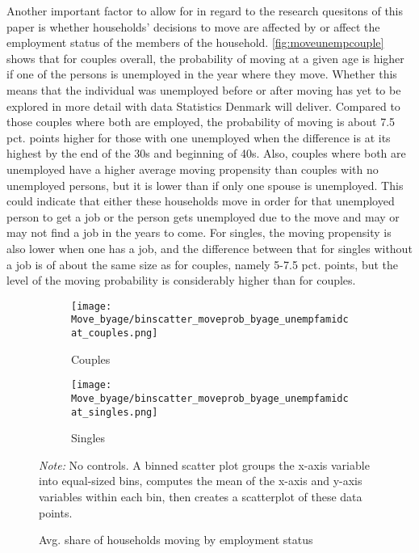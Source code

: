 Another important factor to allow for in regard to the research quesitons of this paper is whether households' decisions to move are affected by or affect the employment status of the members of the household. \autoref{fig:moveunempcouple} shows that for couples overall, the probability of moving at a given age is higher if one of the persons is unemployed in the year where they move. Whether this means that the individual was unemployed before or after moving has yet to be explored in more detail with data Statistics Denmark will deliver. Compared to those couples where both are employed, the probability of moving is about 7.5 pct. points higher for those with one unemployed when the difference is at its highest by the end of the 30s and beginning of 40s. Also, couples where both are unemployed have a higher average moving propensity than couples with no unemployed persons, but it is lower than if only one spouse is unemployed. This could indicate that either these households move in order for that unemployed person to get a job or the person gets unemployed due to the move and may or may not find a job in the years to come. For singles, the moving propensity is also lower when one has a job, and the difference between that for singles without a job is of about the same size as for couples, namely 5-7.5 pct. points, but the level of the moving probability is considerably higher than for couples.
\begin{figure}
\centering
\begin{minipage}{\textwidth}
\begin{subfigure}{.50\textwidth}
  \centering
  \texttt{[image: Move\_byage/binscatter\_moveprob\_byage\_unempfamidcat\_couples.png]}
  \caption{\footnotesize{Couples}}
  \label{fig:moveunempcouple}
\end{subfigure}
\begin{subfigure}{.50\textwidth}
  \centering
  \texttt{[image: Move\_byage/binscatter\_moveprob\_byage\_unempfamidcat\_singles.png]}
  \caption{\footnotesize{Singles}}
  \label{fig:sub2}
\end{subfigure}
{\tiny \emph{Note:} No controls. A binned scatter plot groups the x-axis variable into equal-sized bins, computes the mean of the x-axis and y-axis variables within each bin, then creates a scatterplot of these data points.\par}
\end{minipage}
\caption{Avg. share of households moving by employment status}
\label{fig:moveunempsingle}
\end{figure}
